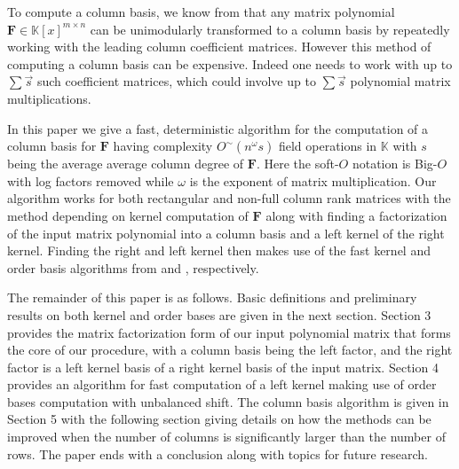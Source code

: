 To compute a column basis, we know from \cite{BL1997} that any matrix
polynomial $\mathbf{F}\in\mathbb{K}\left[x\right]^{m\times n}$ can
be unimodularly transformed to a column basis by repeatedly working
with the leading column coefficient matrices. However this method
of computing a column basis can be expensive. Indeed one needs to
work with up to $\sum\vec{s}$ such coefficient matrices, which could
involve up to $\sum\vec{s}$ polynomial matrix multiplications.

In this paper we give a fast, deterministic algorithm for the computation
of a column basis for $\mathbf{F}$ having complexity $O^{\sim}\left(n^{\omega}s\right)$
field operations in $\mathbb{K}$ with $s$ being the average average
column degree of $\mathbf{F}$. Here the soft-$O$ notation is Big-$O$
with log factors removed while $\omega$ is the exponent of matrix
multiplication. Our algorithm works for both rectangular and non-full
column rank matrices with the method depending on kernel computation
of $\mathbf{F}$ along with finding a factorization of the input matrix
polynomial into a column basis and a left kernel of the right kernel.
Finding the right and left kernel then makes use of the fast kernel
and order basis algorithms from \cite{za2012} and \cite{za2009},
respectively.

The remainder of this paper is as follows. Basic definitions and preliminary
results on both kernel and order bases are given in the next section.
Section 3 provides the matrix factorization form of our input polynomial
matrix that forms the core of our procedure, with a column basis being
the left factor, and the right factor is a left kernel basis of a
right kernel basis of the input matrix. Section 4 provides an algorithm
for fast computation of a left kernel making use of order bases computation
with unbalanced shift. The column basis algorithm is given in Section
5 with the following section giving details on how the methods can
be improved when the number of columns is significantly larger than
the number of rows.  The paper ends with a conclusion along with
topics for future research.
